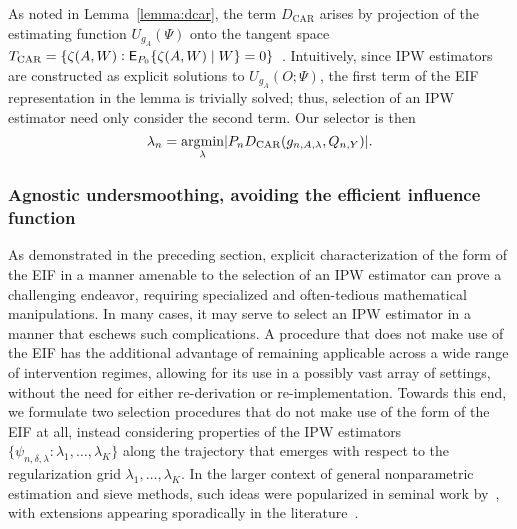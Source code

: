As noted in Lemma~\ref{lemma:dcar}, the term $D_{\text{CAR}}$ arises by
projection of the estimating function $U_{g_A}(\Psi)$ onto the tangent space
$T_{\text{CAR}} = \{\zeta(A,W): \mathsf{E}_{P_0} \{\zeta(A,W) \mid W \} =
0\}$~\citep{robins1994estimation,vdl2003unified}. Intuitively, since
IPW estimators are constructed as explicit solutions to $U_{g_A}(O; \Psi)$, the
first term of the EIF representation in the lemma is trivially solved; thus,
selection of an IPW estimator need only consider the second term. Our selector
is then
\begin{equation*}
  \lambda_n = \operatorname*{\arg\!\min}_{\lambda} \lvert P_n D_{\text{CAR}}(g_{n,A,\lambda},
    Q_{n,Y}) \rvert .
\end{equation*}

\subsubsection{Agnostic undersmoothing, avoiding the efficient influence
  function}

As demonstrated in the preceding section, explicit characterization of the form
of the EIF in a manner amenable to the selection of an IPW estimator can prove
a challenging endeavor, requiring specialized and often-tedious mathematical
manipulations. In many cases, it may serve to select an IPW estimator in
a manner that eschews such complications. A procedure that does not make use of
the EIF has the additional advantage of remaining applicable across a wide range
of intervention regimes, allowing for its use in a possibly vast array of
settings, without the need for either re-derivation or re-implementation.
Towards this end, we formulate two selection procedures that do not make use of
the form of the EIF at all, instead considering properties of the IPW estimators
$\{\psi_{n,\delta,\lambda}: \lambda_1, \ldots, \lambda_K \}$ along the
trajectory that emerges with respect to the regularization grid $\lambda_1,
\ldots, \lambda_K$. In the larger context of general nonparametric estimation
and sieve methods, such ideas were popularized in seminal work
by~\citet{lepskii1991problem,lepskii1992asymptotically}, with extensions
appearing sporadically in the literature~\citep[e.g.,][]{lepskii1997optimal,
birge2001alternative}.

